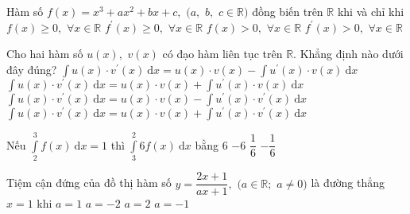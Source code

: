 \begin{ex}%
	Hàm số $f(x)=x^3+a x^2+b x+c,$ $(a,$ $ b,$ $ c \in \mathbb{R})$ đồng biến trên $\mathbb{R}$ khi và chỉ khi
	\choice
	{ $f(x) \geq 0,$ $ \forall x \in \mathbb{R}$}
	{\True $f^{\prime}(x) \geq 0,$ $ \forall x \in \mathbb{R}$}
	{ $f(x)>0, $ $\forall x \in \mathbb{R}$}
	{ $f^{\prime}(x)>0,$ $ \forall x \in \mathbb{R}$}
\end{ex}
\begin{ex}%
	Cho hai hàm số $u(x),$ $ v(x)$ có đạo hàm liên tục trên $\mathbb{R}$. Khẳng định nào dưới đây đúng?
	\choice
	{\True $\displaystyle\int u(x) \cdot v^{\prime}(x) \mathrm{~d} x=u(x) \cdot v(x)-\displaystyle\int u^{\prime}(x) \cdot v(x) \mathrm{~d} x$}
	{ $\displaystyle\int u(x) \cdot v^{\prime}(x) \mathrm{~d} x=u(x) \cdot v(x)+\displaystyle\int u^{\prime}(x) \cdot v(x) \mathrm{~d} x$}
	{ $\displaystyle\int u(x) \cdot v^{\prime}(x) \mathrm{~d} x=u(x) \cdot v(x)-\displaystyle\int u^{\prime}(x) \cdot v^{\prime}(x) \mathrm{~d} x$}
	{ $\displaystyle\int u(x) \cdot v^{\prime}(x) \mathrm{~d} x=u(x) \cdot v(x)+\displaystyle\int u^{\prime}(x) \cdot v^{\prime}(x) \mathrm{~d} x $}
\end{ex}
\begin{ex}%
	Nếu $\displaystyle\int\limits_2^3 f(x) \mathrm{~d} x=1$ thì $\displaystyle\int\limits_3^2 6 f(x) \mathrm{~d} x$ bằng
	\choice
	{ $6$}
	{\True $-6$}
	{ $\dfrac{1}{6}$}
	{ $-\dfrac{1}{6}$}
\end{ex}
\begin{ex}%
	Tiệm cận đứng của đồ thị hàm số $y=\dfrac{2 x+1}{a x+1},$ $(a \in \mathbb{R} ;$ $ a \neq 0)$ là đường thẳng $x=1$ khi
	\choice
	{$a=1$}
	{ $a=-2$}
	{ $a=2$}
	{\True $a=-1$}
\end{ex}
